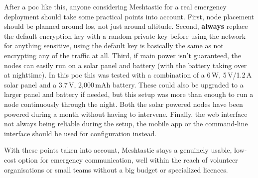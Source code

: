 After a \gls{poc} like this, anyone considering Meshtastic for a real emergency deployment should take some practical points into account.
First, node placement should be planned around \gls{los}, not just around altitude.
Second, \textbf{always} replace the default encryption key with a random private key before using the network for anything sensitive, using the default key is basically the same as not encrypting any of the traffic at all.
Third, if main power isn't guaranteed, the nodes can easily run on a solar panel and battery (with the battery taking over at nighttime). In this \gls{poc} this was tested with a combination of a 6\,W, 5\,V/1.2\,A solar panel and a 3.7\,V, 2,000\,mAh battery. These could also be upgraded to a larger panel and battery if needed, but this setup was more than enough to run a node continuously through the night.
Both the solar powered nodes have been powered during a month without having to intervene.
Finally, the web interface not always being reliable during the setup, the mobile app or the command-line interface should be used for configuration instead.

With these points taken into account, Meshtastic stays a genuinely usable, low-cost option for emergency communication, well within the reach of volunteer organisations or small teams without a big budget or specialized licences.